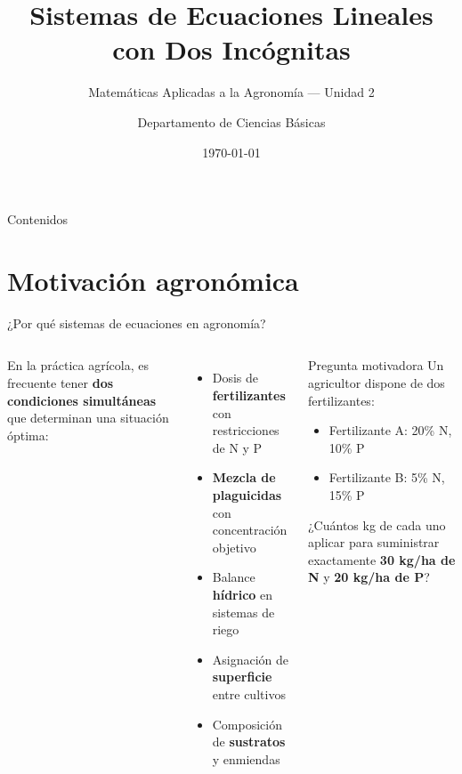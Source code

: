 \documentclass[11pt, aspectratio=169]{beamer}
\title[Sistemas Lineales — Agronomía]{Sistemas de Ecuaciones Lineales\\con Dos Incógnitas}
\subtitle{Matemáticas Aplicadas a la Agronomía — Unidad 2}
\author[Dept. Ciencias Básicas]{Departamento de Ciencias Básicas}
\institute{Facultad de Agronomía}
\date{\today}
\begin{document}

\begin{frame}[plain]
  \titlepage
\end{frame}

\begin{frame}{Contenidos}
  \tableofcontents
\end{frame}

\section{Motivación agronómica}

\begin{frame}{¿Por qué sistemas de ecuaciones en agronomía?}
  \begin{columns}[T]
      En la práctica agrícola, es frecuente tener \textbf{dos condiciones simultáneas}
      que determinan una situación óptima:
      \begin{itemize}
        \item Dosis de \textbf{fertilizantes} con restricciones de N y P
        \item \textbf{Mezcla de plaguicidas} con concentración objetivo
        \item Balance \textbf{hídrico} en sistemas de riego
        \item Asignación de \textbf{superficie} entre cultivos
        \item Composición de \textbf{sustratos} y enmiendas
      \end{itemize}
      \begin{exampleblock}{Pregunta motivadora}
        Un agricultor dispone de dos fertilizantes:
        \begin{itemize}
          \item Fertilizante A: 20\% N, 10\% P
          \item Fertilizante B: 5\% N, 15\% P
        \end{itemize}
        ¿Cuántos kg de cada uno aplicar para suministrar exactamente
        \textbf{30 kg/ha de N} y \textbf{20 kg/ha de P}?
      \end{exampleblock}
  \end{columns}
\end{frame}
\end{document}
